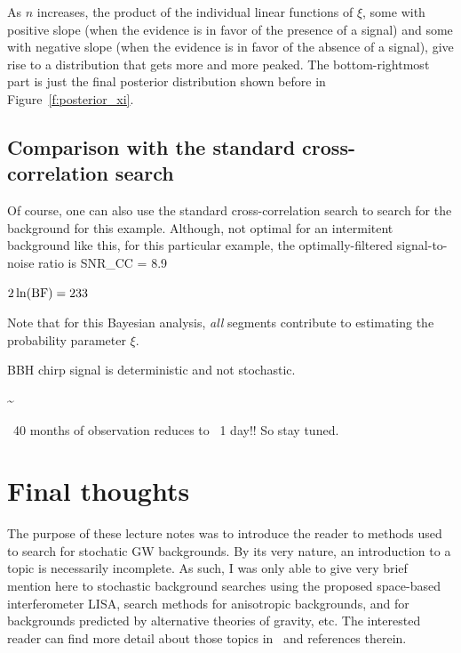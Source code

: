 %
As $n$ increases, the product of the individual linear functions 
of $\xi$,
some with positive slope (when the evidence is in favor of the 
presence of a signal) and some with negative slope (when the 
evidence is in favor of the absence of a signal), give rise to 
a distribution that gets more and more peaked.
The bottom-rightmost part is just the final posterior distribution
shown before in Figure~\ref{f:posterior_xi}.
%

\subsection{Comparison with the standard cross-correlation search}

Of course, one can also use the standard cross-correlation search
to search for the background for this example.
Although, not optimal for an intermitent background like this,
for this particular example, the optimally-filtered signal-to-noise
ratio is 
%
\be
{\rm SNR}_{\rm CC} = 8.9
\ee

$2\ln({\rm BF}) =  233$

Note that for this Bayesian analysis, {\em all} segments contribute
to estimating the probability parameter $\xi$.

BBH chirp signal is deterministic and not stochastic.

\be
{}\sim {}
\ee

~40 months of observation reduces to ~1 day!!
So stay tuned.

\section{Final thoughts}

The purpose of these lecture notes was to introduce the reader to
methods used to search for stochatic GW backgrounds.
By its very nature, an introduction to a topic is necessarily
incomplete.
As such, I was only able to give very brief mention here
to stochastic background searches using the proposed space-based
interferometer LISA, search methods for anisotropic backgrounds, 
and for backgrounds predicted by alternative theories of gravity, etc.
The interested reader can find more detail about those topics
in~\cite{Romano-Cornish:2017} and references therein.

